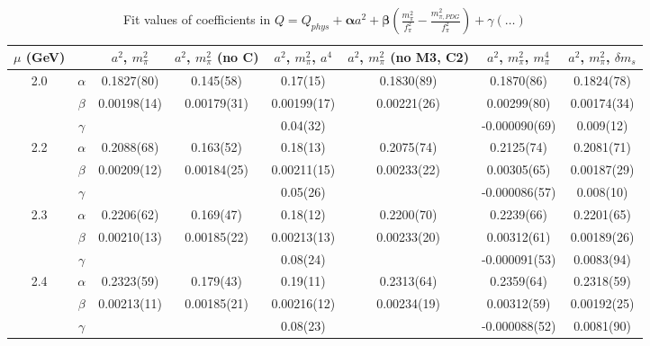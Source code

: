 \documentclass[12pt]{extarticle}
\begin{document}
\begin{table}[h!]
\begin{center}
\begin{tabular}{|c c|c|c|c|c|c|c|}
\hline
$\mu$ (GeV) &  & $a^2$, $m_\pi^2$& $a^2$, $m_\pi^2$ (no C)& $a^2$, $m_\pi^2$, $a^4$& $a^2$, $m_\pi^2$ (no M3, C2)& $a^2$, $m_\pi^2$, $m_\pi^4$& $a^2$, $m_\pi^2$, $\delta m_s$\\
\hline
\multirow{3}{0.5in}{2.0} & $\alpha$ & 0.1827(80)& 0.145(58)& 0.17(15)& 0.1830(89)& 0.1870(86)& 0.1824(78)\\
 & $\beta$ & 0.00198(14)& 0.00179(31)& 0.00199(17)& 0.00221(26)& 0.00299(80)& 0.00174(34)\\
 & $\gamma$ &  &  & 0.04(32)&  & -0.000090(69)& 0.009(12)\\
\hline
\multirow{3}{0.5in}{2.2} & $\alpha$ & 0.2088(68)& 0.163(52)& 0.18(13)& 0.2075(74)& 0.2125(74)& 0.2081(71)\\
 & $\beta$ & 0.00209(12)& 0.00184(25)& 0.00211(15)& 0.00233(22)& 0.00305(65)& 0.00187(29)\\
 & $\gamma$ &  &  & 0.05(26)&  & -0.000086(57)& 0.008(10)\\
\hline
\multirow{3}{0.5in}{2.3} & $\alpha$ & 0.2206(62)& 0.169(47)& 0.18(12)& 0.2200(70)& 0.2239(66)& 0.2201(65)\\
 & $\beta$ & 0.00210(13)& 0.00185(22)& 0.00213(13)& 0.00233(20)& 0.00312(61)& 0.00189(26)\\
 & $\gamma$ &  &  & 0.08(24)&  & -0.000091(53)& 0.0083(94)\\
\hline
\multirow{3}{0.5in}{2.4} & $\alpha$ & 0.2323(59)& 0.179(43)& 0.19(11)& 0.2313(64)& 0.2359(64)& 0.2318(59)\\
 & $\beta$ & 0.00213(11)& 0.00185(21)& 0.00216(12)& 0.00234(19)& 0.00312(59)& 0.00192(25)\\
 & $\gamma$ &  &  & 0.08(23)&  & -0.000088(52)& 0.0081(90)\\
\hline
\end{tabular}
\caption{Fit values of coefficients in $Q = Q_{phys} + \mathbf{\alpha} a^2 + \mathbf{\beta}\left(\frac{m_\pi^2}{f_\pi^2}-\frac{m_{\pi,PDG}^2}{f_\pi^2}\right) + \gamma(\ldots)$}
\end{center}
\end{table}






\end{document}
